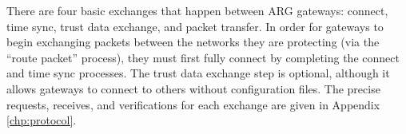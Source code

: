 \par There are four basic exchanges that happen between \ac{ARG} gateways: connect, time sync, trust data exchange, and packet transfer. In order for gateways to begin exchanging packets between the networks they are protecting (via the ``route packet'' process), they must first fully connect by completing the connect and time sync processes. The trust data exchange step is optional, although it allows gateways to connect to others without configuration files. The precise requests, receives, and verifications for each exchange are given in Appendix \ref{chp:protocol}.

